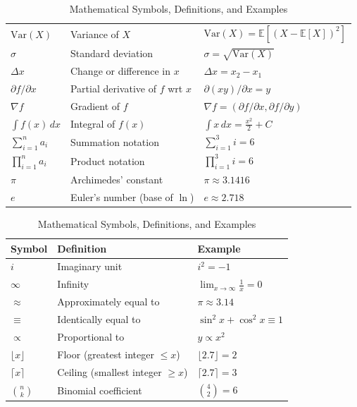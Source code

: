 \documentclass[12pt]{article}
\begin{document}
\begin{table}[ht]
\begin{tabular}{lll}
$\mathrm{Var}(X)$ & Variance of $X$ & $\mathrm{Var}(X)=\mathbb{E}[(X-\mathbb{E}[X])^2]$ \\
$\sigma$ & Standard deviation & $\sigma = \sqrt{\mathrm{Var}(X)}$ \\
$\Delta x$ & Change or difference in $x$ & $\Delta x = x_2-x_1$ \\
$\partial f/\partial x$ & Partial derivative of $f$ wrt $x$ & $\partial(xy)/\partial x = y$ \\
$\nabla f$ & Gradient of $f$ & $\nabla f=(\partial f/\partial x,\partial f/\partial y)$ \\
$\int f(x)\,dx$ & Integral of $f(x)$ & $\int x\,dx = \tfrac{x^2}{2}+C$ \\
$\sum_{i=1}^n a_i$ & Summation notation & $\sum_{i=1}^3 i = 6$ \\
$\prod_{i=1}^n a_i$ & Product notation & $\prod_{i=1}^3 i = 6$ \\
$\pi$ & Archimedes' constant & $\pi \approx 3.1416$ \\
$e$ & Euler’s number (base of $\ln$) & $e \approx 2.718$ \\

\bottomrule
\end{tabular}
\caption{Mathematical Symbols, Definitions, and Examples}
\end{table}


\begin{table}[ht]
\centering
\renewcommand{\arraystretch}{1.3}
\begin{tabular}{lll}
\toprule
\textbf{Symbol} & \textbf{Definition} & \textbf{Example} \\
\midrule

$i$ & Imaginary unit & $i^2 = -1$ \\
$\infty$ & Infinity & $\lim_{x \to \infty} \frac{1}{x} = 0$ \\
$\approx$ & Approximately equal to & $\pi \approx 3.14$ \\
$\equiv$ & Identically equal to & $\sin^2 x + \cos^2 x \equiv 1$ \\
$\propto$ & Proportional to & $y \propto x^2$ \\
$\lfloor x \rfloor$ & Floor (greatest integer $\le x$) & $\lfloor 2.7 \rfloor = 2$ \\
$\lceil x \rceil$ & Ceiling (smallest integer $\ge x$) & $\lceil 2.7 \rceil = 3$ \\
$\binom{n}{k}$ & Binomial coefficient & $\binom{4}{2}=6$ \\
\bottomrule
\end{tabular}
\caption{Mathematical Symbols, Definitions, and Examples}
\end{table}
\end{document}
